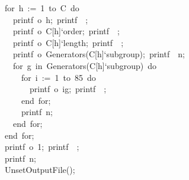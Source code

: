 \begin{tabbing}
for\ h\ :=\ 1\ to\ C\ do\\[0pt]
\ \ printf\ o\ h;\ printf\ \ ;\\[0pt]
\ \ printf\ o\ C[h]`order;\ printf\ \ ;\\[0pt]
\ \ printf\ o\ C[h]`length;\ printf\ \ ;\\[0pt]
\ \ printf\ o\ Generators(C[h]`subgroup);\ printf\ \ n;\\[0pt]
\ \ for\ g\ in\ Generators(C[h]`subgroup)\ do\ \\[0pt]
\ \ \ \ for\ i\ :=\ 1\ to\ 85\ do\\[0pt]
\ \ \ \ \ \ printf\ o\ ig;\ printf\ \ ;\\[0pt]
\ \ \ \ end\ for;\ \\[0pt]
\ \ \ \ printf\ n;\\[0pt]
\ \ end\ for;\ \\[0pt]
end\ for;\\[0pt]
printf\ o\ 1;\ printf\ \ ;\\[0pt]
printf\ n;\\[0pt]
UnsetOutputFile();\\[0pt]
\end{tabbing}

